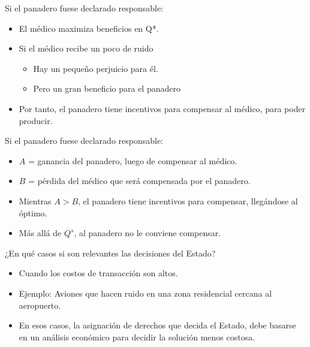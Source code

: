 \begin{frame}{Si el panadero fuese declarado responsable:}
	\begin{multicols}{2}
		\begin{itemize}
			\item El médico maximiza beneficios en Q*.
			\item Si el médico recibe un poco de ruido
				\begin{itemize}
					\item Hay un pequeño perjuicio para él.
					\item Pero un gran beneficio para el panadero
				\end{itemize}
			\item Por tanto, el panadero tiene incentivos para compensar al médico, para poder producir.
		\end{itemize}
		
		\begin{center}
			
		\end{center}
	\end{multicols}
\end{frame}
\begin{frame}{Si el panadero fuese declarado responsable:}
	\begin{multicols}{2}
		\begin{itemize}
			\item $A$ = ganancia del panadero, luego de compensar al médico.
			\item $B$ = pérdida del médico  que será compensada por el panadero.
			\item Mientras $A >B$, el panadero tiene incentivos para compensar, llegándose al óptimo.
			\item Más allá de $Q^s$, al panadero no le conviene  compensar.
		\end{itemize}
		
		\begin{center}
			
		\end{center}
	\end{multicols}
\end{frame}
\begin{frame}{¿En qué casos si son relevantes las decisiones del Estado?}
	\begin{itemize}
		\item Cuando los costos de transacción son altos.
		\item Ejemplo: Aviones que hacen ruido en una zona residencial cercana al aeropuerto.
		\item En esos casos, la asignación de derechos que decida el Estado, debe basarse en un análisis económico para decidir la solución menos costosa.
	\end{itemize}
\end{frame}